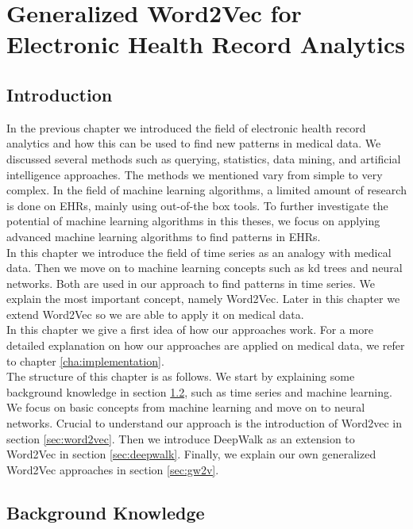 \graphicspath{ {Background/Images/} }


\chapter{Generalized Word2Vec for Electronic Health Record Analytics}
\label{cha:background}

\section{Introduction}

In the previous chapter we introduced the field of electronic health record analytics and how this can be used to find new patterns in medical data. We discussed several methods such as querying, statistics, data mining, and artificial intelligence approaches. The methods we mentioned vary from simple to very complex. In the field of machine learning algorithms, a limited amount of research is done on EHRs, mainly using out-of-the box tools. To further investigate the potential of machine learning algorithms in this theses, we focus on applying advanced machine learning algorithms to find patterns in EHRs. \\

In this chapter we introduce the field of time series as an analogy with medical data. Then we move on to machine learning concepts such as kd trees and neural networks. Both are used in our approach to find patterns in time series. We explain the most important concept, namely Word2Vec. Later in this chapter we extend Word2Vec so we are able to apply it on medical data. \\
In this chapter we give a first idea of how our approaches work. For a more detailed explanation on how our approaches are applied on medical data, we refer to chapter \ref{cha:implementation}. \\

The structure of this chapter is as follows. We start by explaining some background knowledge in section \ref{sec:bk}, such as time series and machine learning. We focus on basic concepts from machine learning and move on to neural networks. Crucial to understand our approach is the introduction of Word2vec in section \ref{sec:word2vec}. Then we introduce DeepWalk as an extension to Word2Vec in section \ref{sec:deepwalk}. Finally, we explain our own generalized Word2Vec approaches in section \ref{sec:gw2v}.


\section{Background Knowledge}
\label{sec:bk}

